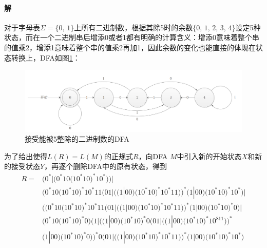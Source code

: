 \documentclass{article}
\begin{document}
\paragraph{解}
对于字母表$\Sigma=\{0,\,1\}$上所有二进制数，根据其除5时的余数$\{0,\,1,\,2,\,3,\,4\}$设定5种状态，而在一个二进制串后增添0或者1都有明确的计算含义：增添0意味着整个串的值乘2，增添1意味着整个串的值乘2再加1，因此余数的变化也能直接的体现在状态转换上，DFA如图\ref{fig:3}：\par
\begin{figure}
\centering
\includegraphics[scale=0.4]{DFA3.png}
\caption{\label{fig:3}接受能被5整除的二进制数的DFA}

\end{figure}
为了给出使得$L(R) = L(M)$的正规式$R$，向DFA $M$中引入新的开始状态$X$和新的接受状态$Y$，再逐个删除DFA中的原有状态，得到
\begin{align*}
    R=&\bigg(0^*|\Big(0^*10\big(10^*10\big)^*10^*\Big)\bigg)\Bigg| \\
    &\Bigg(0^*10\big(10^*10\big)^*10^*11\bigg(01\bigg| \Big(\big(1|00\big)\big(10^*10\big)^*10^*11\Big)\bigg)^*\big(1|00\big)\big(10^*10\big)^*10^*\Bigg)\Bigg| \\
    &\Bigg(\bigg(0^*10\big(10^*10\big)^*10^*11\bigg(01|\Big(\big(1|00\big)\big(10^*10\big)^*10^*11\Big)\bigg)^*\big(1|00\big)\big(10^*10\big)^*0\bigg)\bigg| \\ &\Big(0^*10\big(10^*10\big)^*0\Big)\bigg(1\Big|\Big(\big(1|00\big)\big(10^*10\big)^*0\bigg(01\Big|\Big(\big(1|00\big)\big(10^*10\big)^*10^811\Big)\bigg)^* \\
    &\big(1|00\big)\big(10^*10\big)^*0\Big)\bigg)^*0\bigg(01\Big|\Big(\big(1|00\big)\big(10^*10\big)^*10^*11\Big)\bigg)^*\big(1|00\big)\big(10^*10\big)^*10^*\Bigg)
\end{align*}
\\
\end{document}
